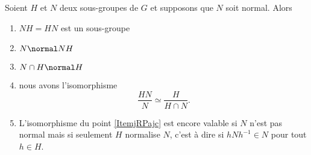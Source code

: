 \begin{theorem}
    Soient \( H\) et \( N\) deux sous-groupes de \( G\) et supposons que \( N\) soit normal. Alors
    \begin{enumerate}
        \item
            \( NH=HN\) est un sous-groupe
        \item
            \( N\normal NH\)
        \item
            \( N\cap H\normal H\)
        \item\label{ItemjRPajc}
            nous avons l'isomorphisme
            \begin{equation}
                \frac{ HN }{ N }\simeq\frac{ H }{ H\cap N }.
            \end{equation}
        \item   \label{ItembgDQEN}
            L'isomorphisme du point \ref{ItemjRPajc} est encore valable si \( N\) n'est pas normal mais si seulement \( H\) normalise \( N\), c'est à dire si \( hNh^{-1}\in N\) pour tout \( h\in H\).
    \end{enumerate}
\end{theorem}


